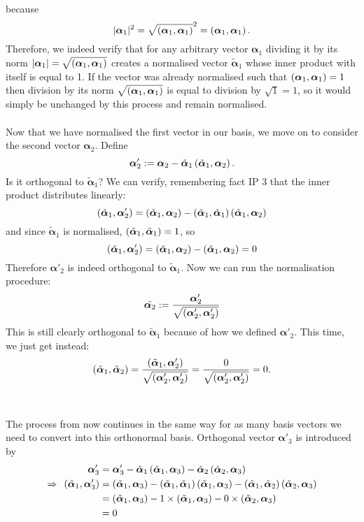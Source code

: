 because
$$
|\bm{\alpha}_{1}|^2= \sqrt{\left(\bm{\alpha}_{1},\bm{\alpha}_{1}\right)}^2 = \left(\bm{\alpha}_{1},\bm{\alpha}_{1}\right).
$$
Therefore, we indeed verify that for any arbitrary vector $\bm{\alpha}_{1}$ dividing it by its norm $|\bm{\alpha}_{1}|=\sqrt{\left(\bm{\alpha}_{1},\bm{\alpha}_{1}\right)}$ creates a normalised vector $\tilde{\bm{\alpha}}_{1}$ whose inner product with itself is equal to 1. If the vector was already normalised such that $\left(\bm{\alpha}_{1},\bm{\alpha}_{1}\right)=1$ then division by its norm $\sqrt{\left(\bm{\alpha}_{1},\bm{\alpha}_{1}\right)}$ is equal to division by $\sqrt{1}=1$, so it would simply be unchanged by this process and remain normalised.
\\\\
Now that we have normalised the first vector in our basis, we move on to consider the second vector $\bm{\alpha}_{2}$. Define
$$
\bm{\alpha}'_{2}:= \bm{\alpha}_{2}-\tilde{\bm{\alpha}}_{1} \left(\tilde{\bm{\alpha}}_{1},\bm{\alpha}_{2}\right).
$$
Is it orthogonal to $\tilde{\bm{\alpha}}_{1}$? We can verify, remembering fact IP 3 that the inner product distributes linearly:
$$
\left({\tilde{\bm{\alpha}}_{1}},\bm{\alpha}'_{2}\right)=\left(\tilde{\bm{\alpha}}_{1},\bm{\alpha}_{2}\right)-\left(\tilde{\bm{\alpha}}_{1},\tilde{\bm{\alpha}}_{1}\right) \left(\tilde{\bm{\alpha}}_{1},\bm{\alpha}_{2}\right)
$$
and since $\tilde{\bm{\alpha}}_{1}$ is normalised, $\left(\tilde{\bm{\alpha}}_{1},\tilde{\bm{\alpha}}_{1}\right)=1$, so
$$
\left({\tilde{\bm{\alpha}}_{1}},\bm{\alpha}'_{2}\right)= \left(\tilde{\bm{\alpha}}_{1},\bm{\alpha}_{2}\right)- \left(\tilde{\bm{\alpha}}_{1},\bm{\alpha}_{2}\right)= 0
$$
Therefore $\bm{\alpha}'_{2}$ is indeed orthogonal to $\tilde{\bm{\alpha}}_{1}$. Now we can run the normalisation procedure:
$$
\tilde{{\bm{\alpha}_{2}}}:= \frac{\bm{\alpha}'_{2}}{\sqrt{\left(\bm{\alpha}'_{2},\bm{\alpha}'_{2}\right)}}
$$
This is still clearly orthogonal to $\tilde{\bm{\alpha}}_{1}$ because of how we defined $\bm{\alpha}'_{2}$. This time, we just get instead:
$$
\left(\tilde{\bm{\alpha}}_{1},\tilde{\bm{\alpha}}_{2}\right)=\frac{\left(\tilde{\bm{\alpha}}_{1},\bm{\alpha}'_{2}\right)}{\sqrt{\left(\bm{\alpha}'_{2},\bm{\alpha}'_{2}\right)}}=\frac{0}{\sqrt{\left(\bm{\alpha}'_{2},\bm{\alpha}'_{2}\right)}}=0.
$$
\\\\
The process from now continues in the same way for as many basis vectors we need to convert into this orthonormal basis. Orthogonal vector $\bm{\alpha}'_{3}$ is introduced by
$$
\begin{aligned}
\bm{\alpha}'_{3}&=\bm{\alpha}'_{3}-\tilde{\bm{\alpha}}_{1}\left(\tilde{\bm{\alpha}}_{1},\bm{\alpha}_{3}\right)-\tilde{\bm{\alpha}}_{2}\left(\tilde{\bm{\alpha}}_{2},\bm{\alpha}_{3}\right) \\ 
\Rightarrow\:\: \left(\tilde{\bm{\alpha}}_{1},\bm{\alpha}'_{3}\right)&=\left(\tilde{\bm{\alpha}}_{1},\bm{\alpha}_{3}\right)-\left(\tilde{\bm{\alpha}}_{1},\tilde{\bm{\alpha}}_{1}\right)\left(\tilde{\bm{\alpha}}_{1},\bm{\alpha}_{3}\right)-\left(\tilde{\bm{\alpha}}_{1},\tilde{\bm{\alpha}}_{2}\right)\left(\tilde{\bm{\alpha}}_{2},\bm{\alpha}_{3}\right)\\
&= \left(\tilde{\bm{\alpha}}_{1},\bm{\alpha}_{3}\right)-1\times\left(\tilde{\bm{\alpha}}_{1},\bm{\alpha}_{3}\right)-0\times\left(\tilde{\bm{\alpha}}_{2},\bm{\alpha}_{3}\right)\\
&=0\\
\end{aligned}
$$
